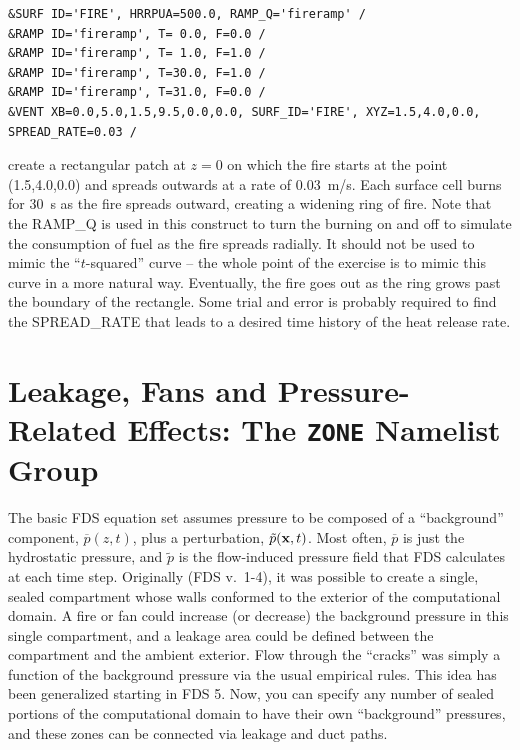 \documentclass[11pt]{book}
\newcommand{\bx}{{\bf x}}
\newcommand{\tp}{\tilde{p}}
\newcommand{\bp}{\overline{p}}
\begin{document}
\footnotesize
\begin{verbatim}
&SURF ID='FIRE', HRRPUA=500.0, RAMP_Q='fireramp' /
&RAMP ID='fireramp', T= 0.0, F=0.0 /
&RAMP ID='fireramp', T= 1.0, F=1.0 /
&RAMP ID='fireramp', T=30.0, F=1.0 /
&RAMP ID='fireramp', T=31.0, F=0.0 /
&VENT XB=0.0,5.0,1.5,9.5,0.0,0.0, SURF_ID='FIRE', XYZ=1.5,4.0,0.0, SPREAD_RATE=0.03 /
\end{verbatim}
\normalsize
create a rectangular patch at $z=0$ on which the fire starts at the
point (1.5,4.0,0.0) and spreads outwards at a rate of 0.03~m/s. Each surface cell
burns for 30~s as the fire spreads outward, creating a widening ring of fire. Note that the {\ct RAMP\_Q} is used in this
construct to turn the burning on and off to simulate the consumption of fuel as the fire spreads radially. It should not
be used to mimic the ``$t$-squared'' curve -- the whole point of the exercise is to mimic this curve in a more natural way.
Eventually, the fire goes out as the ring grows past the boundary of the rectangle.
Some trial and error is probably required to find the {\ct SPREAD\_RATE} that
leads to a desired time history of the heat release rate.




\clearpage

\section{Leakage, Fans and Pressure-Related Effects: The \texorpdfstring{{\tt ZONE}}{ZONE} Namelist Group}
\label{info:ZONE}

The basic FDS equation set assumes pressure
to be composed of a ``background'' component, $\bp(z,t)$, plus a perturbation, $\tp(\bx,t)$. Most
often, $\bp$ is just the hydrostatic pressure, and $\tp$ is the flow-induced pressure field that
FDS calculates at each time step. Originally (FDS v.~1-4), it was possible to create a single, sealed
compartment whose walls conformed to the exterior of the computational domain. A fire or fan could
increase (or decrease) the background pressure in this single compartment, and a leakage area could
be defined between the compartment and the ambient exterior. Flow through the ``cracks'' was simply
a function of the background pressure via the usual empirical rules.
This idea has been generalized starting in FDS 5. Now, you can specify any number of sealed portions of the computational
domain to have their own ``background'' pressures, and these zones can be connected via leakage and duct paths.
\end{document}
